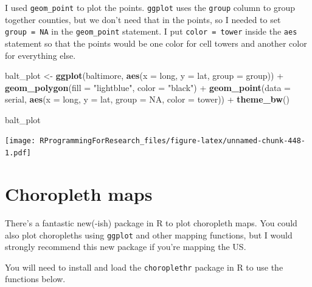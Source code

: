 \documentclass[]{book}
\makeatletter
\newenvironment{Shaded}{\begin{snugshade}}{\end{snugshade}}
\newcommand{\KeywordTok}[1]{\textcolor[rgb]{0.13,0.29,0.53}{\textbf{{#1}}}}
\newcommand{\DataTypeTok}[1]{\textcolor[rgb]{0.13,0.29,0.53}{{#1}}}
\newcommand{\StringTok}[1]{\textcolor[rgb]{0.31,0.60,0.02}{{#1}}}
\newcommand{\OtherTok}[1]{\textcolor[rgb]{0.56,0.35,0.01}{{#1}}}
\newcommand{\NormalTok}[1]{{#1}}
\newenvironment{kframe}{%
\medskip{}
\setlength{\fboxsep}{.8em}
 \def\at@end@of@kframe{}%
 \ifinner\ifhmode%
  \def\at@end@of@kframe{\end{minipage}}%
  \begin{minipage}{\columnwidth}%
 \fi\fi%
 \def\FrameCommand##1{\hskip\@totalleftmargin \hskip-\fboxsep
 \colorbox{shadecolor}{##1}\hskip-\fboxsep
     \hskip-\linewidth \hskip-\@totalleftmargin \hskip\columnwidth}%
 \MakeFramed {\advance\hsize-\width
   \@totalleftmargin\z@ \linewidth\hsize
   \@setminipage}}%
 {\par\unskip\endMakeFramed%
 \at@end@of@kframe}
\renewenvironment{Shaded}{\begin{kframe}}{\end{kframe}}
\makeatother
\begin{document}
I used \texttt{geom\_point} to plot the points. \texttt{ggplot} uses the
\texttt{group} column to group together counties, but we don't need that
in the points, so I needed to set \texttt{group\ =\ NA} in the
\texttt{geom\_point} statement. I put \texttt{color\ =\ tower} inside
the \texttt{aes} statement so that the points would be one color for
cell towers and another color for everything else.

\begin{Shaded}
\begin{Highlighting}[]
\NormalTok{balt_plot <-}\StringTok{ }\KeywordTok{ggplot}\NormalTok{(baltimore, }
                    \KeywordTok{aes}\NormalTok{(}\DataTypeTok{x =} \NormalTok{long, }\DataTypeTok{y =} \NormalTok{lat, }\DataTypeTok{group =} \NormalTok{group)) +}\StringTok{ }
\StringTok{        }\KeywordTok{geom_polygon}\NormalTok{(}\DataTypeTok{fill =} \StringTok{"lightblue"}\NormalTok{, }\DataTypeTok{color =} \StringTok{"black"}\NormalTok{) +}
\StringTok{        }\KeywordTok{geom_point}\NormalTok{(}\DataTypeTok{data =} \NormalTok{serial, }\KeywordTok{aes}\NormalTok{(}\DataTypeTok{x =} \NormalTok{long, }\DataTypeTok{y =} \NormalTok{lat,}
                                      \DataTypeTok{group =} \OtherTok{NA}\NormalTok{,}
                                      \DataTypeTok{color =} \NormalTok{tower)) +}\StringTok{ }
\StringTok{        }\KeywordTok{theme_bw}\NormalTok{()}
\end{Highlighting}
\end{Shaded}

\begin{Shaded}
\begin{Highlighting}[]
\NormalTok{balt_plot}
\end{Highlighting}
\end{Shaded}

\texttt{[image: RProgrammingForResearch\_files/figure-latex/unnamed-chunk-448-1.pdf]}

\section{Choropleth maps}\label{choropleth-maps}

There's a fantastic new(-ish) package in R to plot choropleth maps. You
could also plot choropleths using \texttt{ggplot} and other mapping
functions, but I would strongly recommend this new package if you're
mapping the US.

You will need to install and load the \texttt{choroplethr} package in R
to use the functions below.
\end{document}
